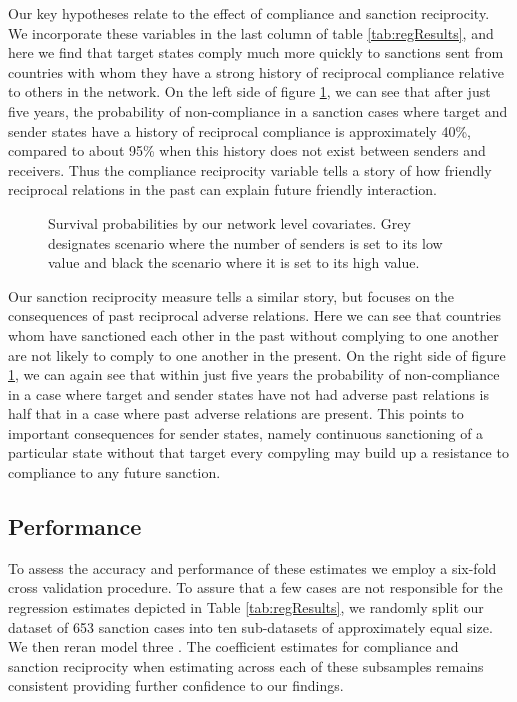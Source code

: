 Our key hypotheses relate to the effect of compliance and sanction reciprocity. We incorporate these variables in the last column of table \ref{tab:regResults}, and here we find that target states comply much more quickly to sanctions sent from countries with whom they have a strong history of reciprocal compliance relative to others in the network. On the left side of figure \ref{fig:surv3}, we can see that after just five years, the probability of non-compliance in a sanction cases where target and sender states have a history of reciprocal compliance is approximately 40\%, compared to about 95\% when this history does not exist between senders and receivers. Thus the compliance reciprocity variable tells a story of how friendly reciprocal relations in the past can explain future friendly interaction. 

\begin{figure}[ht]
	\centering
	\caption{Survival probabilities by our network level covariates. Grey designates scenario where the number of senders is set to its low value and black the scenario where it is set to its high value.}
	\resizebox{1\textwidth}{!}{}	
	\label{fig:surv3}	
\end{figure}
\FloatBarrier

Our sanction reciprocity measure tells a similar story, but focuses on the consequences of past reciprocal adverse relations. Here we can see that countries whom have sanctioned each other in the past without complying to one another are not likely to comply to one another in the present. On the right side of figure \ref{fig:surv3}, we can again see that within just five years the probability of non-compliance in a case where target and sender states have not had adverse past relations is half that in a case where past adverse relations are present. This points to important consequences for sender states, namely continuous sanctioning of a particular state without that target every compyling  may build up a resistance to compliance to any future sanction. 

\subsection*{Performance}

To assess the accuracy and performance of these estimates we employ a six-fold cross validation procedure. To assure that a few cases are not responsible for the regression estimates depicted in Table \ref{tab:regResults}, we randomly split our dataset of 653 sanction cases into ten sub-datasets of approximately equal size. We then reran model three . The coefficient estimates for compliance and sanction reciprocity when estimating across each of these subsamples remains consistent providing further confidence to our findings.

